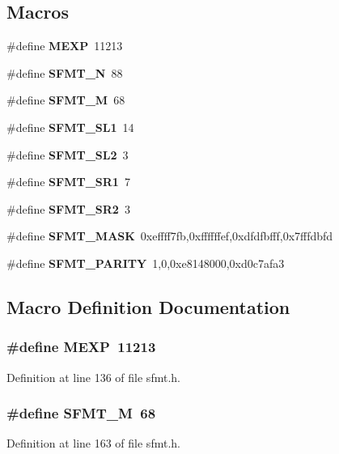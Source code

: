 \subsection*{Macros}
\begin{DoxyCompactItemize}
\item 
\#define {\bf M\-E\-X\-P}~11213
\item 
\#define {\bf S\-F\-M\-T\-\_\-\-N}~88
\item 
\#define {\bf S\-F\-M\-T\-\_\-\-M}~68
\item 
\#define {\bf S\-F\-M\-T\-\_\-\-S\-L1}~14
\item 
\#define {\bf S\-F\-M\-T\-\_\-\-S\-L2}~3
\item 
\#define {\bf S\-F\-M\-T\-\_\-\-S\-R1}~7
\item 
\#define {\bf S\-F\-M\-T\-\_\-\-S\-R2}~3
\item 
\#define {\bf S\-F\-M\-T\-\_\-\-M\-A\-S\-K}~0xeffff7fb,0xffffffef,0xdfdfbfff,0x7fffdbfd
\item 
\#define {\bf S\-F\-M\-T\-\_\-\-P\-A\-R\-I\-T\-Y}~1,0,0xe8148000,0xd0c7afa3
\end{DoxyCompactItemize}


\subsection{Macro Definition Documentation}
\subsubsection[{M\-E\-X\-P}]{\setlength{\rightskip}{0pt plus 5cm}\#define M\-E\-X\-P~11213}\label{toolboxes_2rnd_2sfmt_8h_acff9c8882ddb918df117f9710013d828}


Definition at line 136 of file sfmt.\-h.

\subsubsection[{S\-F\-M\-T\-\_\-\-M}]{\setlength{\rightskip}{0pt plus 5cm}\#define S\-F\-M\-T\-\_\-\-M~68}\label{toolboxes_2rnd_2sfmt_8h_aa1d6a9c39d7d7aba10f5c1dea7429e3d}


Definition at line 163 of file sfmt.\-h.

